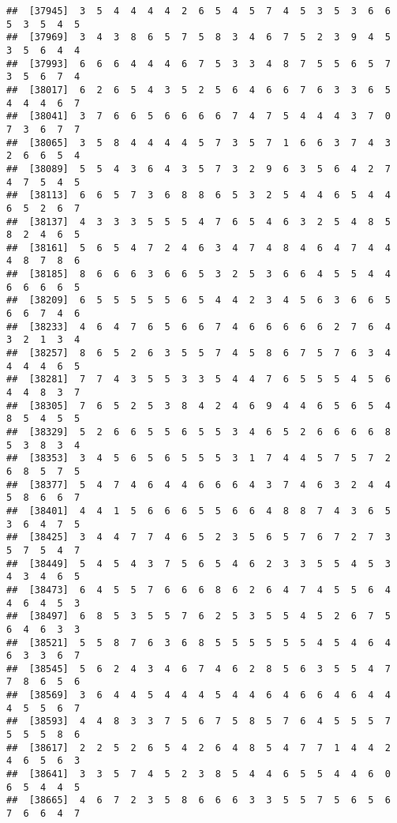 \documentclass[
]{book}
\begin{document}
\begin{verbatim}
##  [37945]  3  5  4  4  4  4  2  6  5  4  5  7  4  5  3  5  3  6  6  5  3  5  4  5
##  [37969]  3  4  3  8  6  5  7  5  8  3  4  6  7  5  2  3  9  4  5  3  5  6  4  4
##  [37993]  6  6  6  4  4  4  6  7  5  3  3  4  8  7  5  5  6  5  7  3  5  6  7  4
##  [38017]  6  2  6  5  4  3  5  2  5  6  4  6  6  7  6  3  3  6  5  4  4  4  6  7
##  [38041]  3  7  6  6  5  6  6  6  6  7  4  7  5  4  4  4  3  7  0  7  3  6  7  7
##  [38065]  3  5  8  4  4  4  4  5  7  3  5  7  1  6  6  3  7  4  3  2  6  6  5  4
##  [38089]  5  5  4  3  6  4  3  5  7  3  2  9  6  3  5  6  4  2  7  4  7  5  4  5
##  [38113]  6  6  5  7  3  6  8  8  6  5  3  2  5  4  4  6  5  4  4  6  5  2  6  7
##  [38137]  4  3  3  3  5  5  5  4  7  6  5  4  6  3  2  5  4  8  5  8  2  4  6  5
##  [38161]  5  6  5  4  7  2  4  6  3  4  7  4  8  4  6  4  7  4  4  4  8  7  8  6
##  [38185]  8  6  6  6  3  6  6  5  3  2  5  3  6  6  4  5  5  4  4  6  6  6  6  5
##  [38209]  6  5  5  5  5  5  6  5  4  4  2  3  4  5  6  3  6  6  5  6  6  7  4  6
##  [38233]  4  6  4  7  6  5  6  6  7  4  6  6  6  6  6  2  7  6  4  3  2  1  3  4
##  [38257]  8  6  5  2  6  3  5  5  7  4  5  8  6  7  5  7  6  3  4  4  4  4  6  5
##  [38281]  7  7  4  3  5  5  3  3  5  4  4  7  6  5  5  5  4  5  6  4  4  8  3  7
##  [38305]  7  6  5  2  5  3  8  4  2  4  6  9  4  4  6  5  6  5  4  8  5  4  5  5
##  [38329]  5  2  6  6  5  5  6  5  5  3  4  6  5  2  6  6  6  6  8  5  3  8  3  4
##  [38353]  3  4  5  6  5  6  5  5  5  3  1  7  4  4  5  7  5  7  2  6  8  5  7  5
##  [38377]  5  4  7  4  6  4  4  6  6  6  4  3  7  4  6  3  2  4  4  5  8  6  6  7
##  [38401]  4  4  1  5  6  6  6  5  5  6  6  4  8  8  7  4  3  6  5  3  6  4  7  5
##  [38425]  3  4  4  7  7  4  6  5  2  3  5  6  5  7  6  7  2  7  3  5  7  5  4  7
##  [38449]  5  4  5  4  3  7  5  6  5  4  6  2  3  3  5  5  4  5  3  4  3  4  6  5
##  [38473]  6  4  5  5  7  6  6  6  8  6  2  6  4  7  4  5  5  6  4  4  6  4  5  3
##  [38497]  6  8  5  3  5  5  7  6  2  5  3  5  5  4  5  2  6  7  5  6  4  6  3  3
##  [38521]  5  5  8  7  6  3  6  8  5  5  5  5  5  5  4  5  4  6  4  6  3  3  6  7
##  [38545]  5  6  2  4  3  4  6  7  4  6  2  8  5  6  3  5  5  4  7  7  8  6  5  6
##  [38569]  3  6  4  4  5  4  4  4  5  4  4  6  4  6  6  4  6  4  4  4  5  5  6  7
##  [38593]  4  4  8  3  3  7  5  6  7  5  8  5  7  6  4  5  5  5  7  5  5  5  8  6
##  [38617]  2  2  5  2  6  5  4  2  6  4  8  5  4  7  7  1  4  4  2  4  6  5  6  3
##  [38641]  3  3  5  7  4  5  2  3  8  5  4  4  6  5  5  4  4  6  0  6  5  4  4  5
##  [38665]  4  6  7  2  3  5  8  6  6  6  3  3  5  5  7  5  6  5  6  7  6  6  4  7

\end{verbatim}
\end{document}
